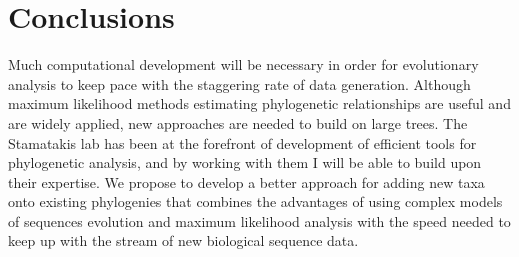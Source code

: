 \documentclass[10pt]{article}
\begin{document}
\section*{Conclusions}
Much computational development will be necessary in order for evolutionary analysis to keep pace with the staggering rate of data generation. 
Although maximum likelihood methods estimating phylogenetic relationships are useful and are widely applied, new approaches are needed to build on large trees. 
The Stamatakis lab has been at the forefront of development of efficient tools for phylogenetic analysis, and by working with them I will be able to build upon their expertise. 
We propose to develop a better approach for adding new taxa onto existing phylogenies that combines the advantages of using complex models of sequences evolution and maximum likelihood analysis with the speed needed to keep up with the stream of new biological sequence data. 



\end{document}
